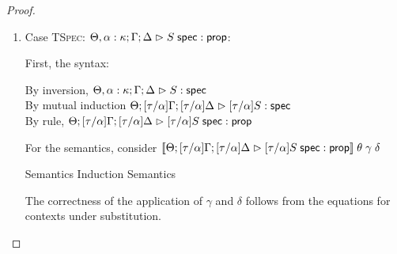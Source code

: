 \begin{proof}
\begin{enumerate}
  For the semantics, consider $\interp{\judgeA[\Theta; {[\tau/\alpha]}\Gamma; {[\tau/\alpha]}\Delta]{{[\tau/\alpha]}p}{{[\tau/\alpha]}\omega}}\;\theta\;\gamma\;\delta$ \\
  \begin{eqnproof}
          {Semantics}
          {Induction}
          {Semantics}
  \end{eqnproof}
  The correctness of the application of $\gamma$ and $\delta$ follows from the equations for
  contexts under substitution. 

\item Case \textsc{TSpec}: $\judgeA[\Theta, \alpha:\kappa; \Gamma; \Delta]{\validprop{S}}{\assert}$:
  
  First, the syntax:
  \begin{tabbedproof}
    \oo By inversion, $\judgeS[\Theta, \alpha:\kappa; \Gamma; \Delta]{S}$ \\
    \oo By mutual induction $\judgeS[\Theta; {[\tau/\alpha]}\Gamma; {[\tau/\alpha]}\Delta]{{[\tau/\alpha]}S}$\\
    \oo By rule, $\judgeA[\Theta; {[\tau/\alpha]}\Gamma; {[\tau/\alpha]}\Delta]{\validprop{{[\tau/\alpha]}S}}{\assert}$
  \end{tabbedproof}

  For the semantics, consider $\interp{\judgeA[\Theta; {[\tau/\alpha]}\Gamma; {[\tau/\alpha]}\Delta]{\validprop{{[\tau/\alpha]}S}}{\assert}}\;\theta\;\gamma\;\delta$ 
  \begin{eqnproof}
          {Semantics}
          {Induction}
          {Semantics}
  \end{eqnproof}
  The correctness of the application of $\gamma$ and $\delta$ follows from the equations for
  contexts under substitution. 


\end{enumerate}
\end{proof}

